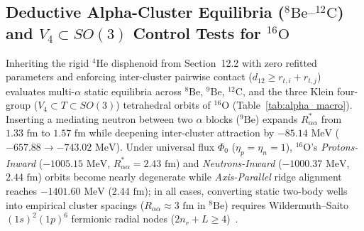 \documentclass[11pt, a4paper]{article}
\begin{document}
\subsection{\texorpdfstring{Deductive Alpha-Cluster Equilibria ($^8\text{Be}\text{--}{}^{12}\text{C}$) and $V_4 \subset SO(3)$ Control Tests for $^{16}\text{O}$}{Deductive Alpha-Cluster Equilibria (8Be--12C) and V4 Control Tests for 16O}}
Inheriting the rigid $^4\text{He}$ disphenoid from Section~12.2 with zero refitted parameters and enforcing inter-cluster pairwise contact ($d_{12} \ge r_{t,i} + r_{t,j}$) evaluates multi-$\alpha$ static equilibria across $^8\text{Be}$, $^9\text{Be}$, $^{12}\text{C}$, and the three Klein four-group ($V_4 \subset T \subset SO(3)$) tetrahedral orbits of $^{16}\text{O}$ (Table~\ref{tab:alpha_macro}). Inserting a mediating neutron between two $\alpha$ blocks ($^9\text{Be}$) expands $R_{\alpha\alpha}^*$ from $1.33\text{ fm}$ to $1.57\text{ fm}$ while deepening inter-cluster attraction by $-85.14\text{ MeV}$ ($-657.88 \to -743.02\text{ MeV}$). Under universal flux $\Phi_0$ ($\eta_p = \eta_n = 1$), $^{16}\text{O}$'s \emph{Protons-Inward} ($-1005.15\text{ MeV}$, $R_{\alpha\alpha}^* = 2.43\text{ fm}$) and \emph{Neutrons-Inward} ($-1000.37\text{ MeV}$, $2.44\text{ fm}$) orbits become nearly degenerate while \emph{Axis-Parallel} ridge alignment reaches $-1401.60\text{ MeV}$ ($2.44\text{ fm}$); in all cases, converting static two-body wells into empirical cluster spacings ($R_{\alpha\alpha} \approx 3\text{ fm}$ in $^8\text{Be}$) requires Wildermuth--Saito $(1s)^2(1p)^6$ fermionic radial nodes ($2n_r + L \ge 4$)~\cite{wildermuth1977}.
\end{document}

